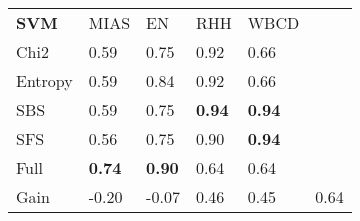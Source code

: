 \begin{tabular}{|l|l|l|l|l|l}
\cline{1-5}
        \textbf{SVM} & MIAS              & EN                & RHH               & WBCD      &         \\
\cline{1-5}
Chi2    &  0.59 &  0.75 & 0.92 & 0.66 \\
Entropy &  0.59 &  0.84 & 0.92 & 0.66 \\
SBS     &  0.59 &  0.75 & \textbf{0.94} & \textbf{0.94} \\
SFS     &  0.56 &  0.75 & 0.90 & \textbf{0.94} \\
Full    &  \textbf{0.74} &  \textbf{0.90} & 0.64 & 0.64 \\
\cline{1-5}
Gain    & -0.20 & -0.07 & 0.46 & 0.45 & 0.64 \\
\end{tabular}
